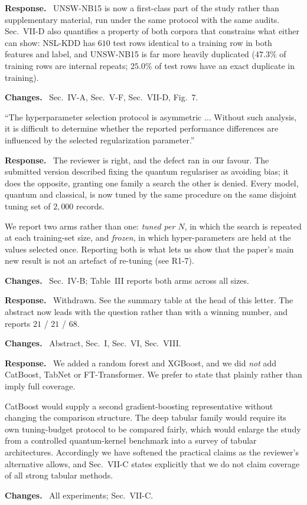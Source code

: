 \documentclass[11pt,a4paper]{article}
\newenvironment{revcomment}
  {\par\addvspace{6pt}\begingroup
   \color{quotegray}\itshape\small
   \begin{list}{}{%
     \setlength{\leftmargin}{1.8em}\setlength{\rightmargin}{1.0em}%
     \setlength{\topsep}{0pt}\setlength{\partopsep}{0pt}%
     \setlength{\parsep}{3pt}\setlength{\itemsep}{0pt}}%
   \item[]}
  {\end{list}\endgroup\normalcolor\addvspace{6pt}}
\newcommand{\itemhead}[2]{%
  \par\addvspace{15pt}%
  \noindent{\bfseries\color{tagink}#1}\hspace{0.7em}{\bfseries #2}%
  \par\addvspace{3.5pt}%
  \noindent{\color{rulegray}\rule{\linewidth}{0.5pt}}%
  \par\addvspace{5pt}%
  \nobreak}
\newcommand{\resp}{\par\addvspace{2pt}\noindent\textbf{Response.}\ }
\newcommand{\changed}{\par\addvspace{5pt}\noindent
  {\bfseries\color{tagink}Changes.}\ }
\begin{document}
\itemhead{R1-2}{Reliance on NSL-KDD; UNSW supplementary was not available}
\resp
UNSW-NB15 is now a first-class part of the study rather than supplementary
material, run under the same protocol with the same audits. Sec.~VII-D also
quantifies a property of both corpora that constrains what either can show:
NSL-KDD has $610$ test rows identical to a training row in both features and
label, and UNSW-NB15 is far more heavily duplicated ($47.3\%$ of training rows
are internal repeats; $25.0\%$ of test rows have an exact duplicate in
training).
\changed
Sec.~IV-A, Sec.~V-F, Sec.~VII-D, Fig.~7.

\itemhead{R1-3}{Asymmetric hyper-parameter protocol: QSVM fixed at $C=1.0$,
classical SVMs validation-selected}
\begin{revcomment}
``The hyperparameter selection protocol is asymmetric $\ldots$ Without such
analysis, it is difficult to determine whether the reported performance
differences are influenced by the selected regularization parameter.''
\end{revcomment}
\resp
The reviewer is right, and the defect ran in our favour. The submitted version
described fixing the quantum regulariser as avoiding bias; it does the opposite,
granting one family a search the other is denied. Every model, quantum and
classical, is now tuned by the same procedure on the same disjoint tuning set of
$2{,}000$ records.

We report two arms rather than one: \emph{tuned per $N$}, in which the search is
repeated at each training-set size, and \emph{frozen}, in which hyper-parameters
are held at the values selected once. Reporting both is what lets us show that
the paper's main new result is not an artefact of re-tuning (see R1-7).
\changed
Sec.~IV-B; Table~III reports both arms across all sizes.

\itemhead{R1-4}{Conclusions overstated; cannot claim general quantum advantage}
\resp
Withdrawn. See the summary table at the head of this letter. The abstract now
leads with the question rather than with a winning number, and reports $21$ /
$21$ / $68$.
\changed
Abstract, Sec.~I, Sec.~VI, Sec.~VIII.

\itemhead{R1-5}{Include XGBoost, CatBoost, TabNet, FT-Transformer, or soften
practical claims}
\resp
We added a random forest and XGBoost, and we did \emph{not} add CatBoost, TabNet
or FT-Transformer. We prefer to state that plainly rather than imply full
coverage.

CatBoost would supply a second gradient-boosting representative without changing
the comparison structure. The deep tabular family would require its own
tuning-budget protocol to be compared fairly, which would enlarge the study from
a controlled quantum-kernel benchmark into a survey of tabular architectures.
Accordingly we have softened the practical claims as the reviewer's alternative
allows, and Sec.~VII-C states explicitly that we do not claim coverage of all
strong tabular methods.
\changed
All experiments; Sec.~VII-C.
\end{document}
